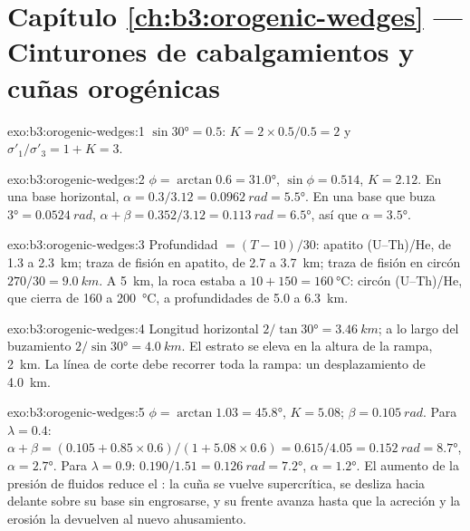 \section*{Capítulo \ref{ch:b3:orogenic-wedges} --- Cinturones de cabalgamientos y cuñas orogénicas}

\begin{solution}{exo:b3:orogenic-wedges:1}
$\sin\ang{30} = 0.5$: $K = 2\times0.5/0.5 = 2$ y $\sigma'_1/\sigma'_3 = 1 +
K = 3$.
\end{solution}

\begin{solution}{exo:b3:orogenic-wedges:2}
$\phi = \arctan0.6 = \ang{31.0}$, $\sin\phi = 0.514$, $K = 2.12$. En una
base horizontal, $\alpha = 0.3/3.12 = \qty{0.0962}{rad} = \ang{5.5}$. En una
base que buza $\ang{3} = \qty{0.0524}{rad}$, $\alpha + \beta = 0.352/3.12 =
\qty{0.113}{rad} = \ang{6.5}$, así que $\alpha = \ang{3.5}$.
\end{solution}

\begin{solution}{exo:b3:orogenic-wedges:3}
Profundidad $= (T - 10)/30$: apatito (U--Th)/He, de 1.3 a \qty{2.3}{km}; traza de fisión
en apatito, de 2.7 a \qty{3.7}{km}; traza de fisión en circón $270/30 = \qty{9.0}{km}$. A
\qty{5}{km}, la roca estaba a $10 + 150 = \qty{160}{\celsius}$: circón
(U--Th)/He, que cierra de 160 a \qty{200}{\celsius}, a profundidades de 5.0 a
\qty{6.3}{km}.
\end{solution}

\begin{solution}{exo:b3:orogenic-wedges:4}
Longitud horizontal $2/\tan\ang{30} = \qty{3.46}{km}$; a lo largo del buzamiento
$2/\sin\ang{30} = \qty{4.0}{km}$. El estrato se eleva en la altura de la rampa,
\qty{2}{km}. La línea de corte debe recorrer toda la rampa: un desplazamiento de
\qty{4.0}{km}.
\end{solution}

\begin{solution}{exo:b3:orogenic-wedges:5}
$\phi = \arctan1.03 = \ang{45.8}$, $K = 5.08$; $\beta = \qty{0.105}{rad}$.
Para $\lambda = 0.4$: $\alpha + \beta = (0.105 + 0.85\times0.6)/(1 +
5.08\times0.6) = 0.615/4.05 = \qty{0.152}{rad} = \ang{8.7}$, $\alpha =
\ang{2.7}$. Para $\lambda = 0.9$: $0.190/1.51 = \qty{0.126}{rad} = \ang{7.2}$,
$\alpha = \ang{1.2}$. El aumento de la presión de fluidos reduce el :
la cuña se vuelve supercrítica, se desliza hacia delante sobre su base sin
engrosarse, y su frente avanza hasta que la acreción y la erosión la devuelven
al nuevo ahusamiento.
\end{solution}

